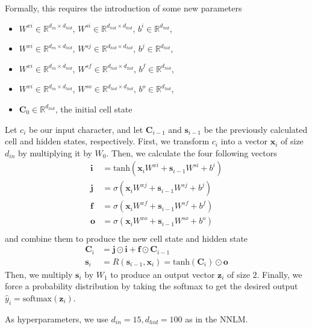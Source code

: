 \documentclass[11pt]{article}
\begin{document}
Formally, this requires the introduction of some new parameters
\begin{itemize}
  \item $W^{xi} \in \mathbb{R}^{d_{in} \times d_{hid}}$, $W^{si} \in \mathbb{R}^{d_{hid} \times d_{hid}}$, $b^i \in \mathbb{R}^{d_{hid}}$, 
  \item $W^{xi} \in \mathbb{R}^{d_{in} \times d_{hid}}$, $W^{sj} \in \mathbb{R}^{d_{hid} \times d_{hid}}$, $b^j \in \mathbb{R}^{d_{hid}}$,
  \item $W^{xi} \in \mathbb{R}^{d_{in} \times d_{hid}}$, $W^{sf} \in \mathbb{R}^{d_{hid} \times d_{hid}}$, $b^f \in \mathbb{R}^{d_{hid}}$,
  \item $W^{xi} \in \mathbb{R}^{d_{in} \times d_{hid}}$, $W^{so} \in \mathbb{R}^{d_{hid} \times d_{hid}}$, $b^o \in \mathbb{R}^{d_{hid}}$,
  \item $\mathbf{C}_0 \in \mathbb{R}^{d_{hid}}$, the initial cell state
\end{itemize}

Let $c_i$ be our input character, and let $\mathbf{C}_{i-1}$ and $\mathbf{s}_{i-1}$ be the previously calculated cell and hidden states, respectively. First, we transform $c_i$ into a vector $\mathbf{x}_i$ of size $d_{in}$ by multiplying it by $W_0$. Then, we calculate the four following vectors
\begin{align*}
  \mathbf{i} &= \text{tanh}(\mathbf{x}_iW^{xi} + \mathbf{s}_{i-1}W^{si} + b^i) \\
  \mathbf{j} &= \sigma(\mathbf{x}_iW^{xj} + \mathbf{s}_{i-1}W^{sj} + b^j) \\
  \mathbf{f} &= \sigma(\mathbf{x}_iW^{xf} + \mathbf{s}_{i-1}W^{sf} + b^f) \\
  \mathbf{o} &= \sigma(\mathbf{x}_iW^{xo} + \mathbf{s}_{i-1}W^{so} + b^o) \\
\end{align*}
and combine them to produce the new cell state and hidden state
\begin{align*}
  \mathbf{C}_i &= \mathbf{j} \odot \mathbf{i} + \mathbf{f} \odot \mathbf{C}_{i-1} \\
  \mathbf{s}_i &= R(\mathbf{s}_{i-1}, \mathbf{x}_i) = \text{tanh}(\mathbf{C}_i) \odot \mathbf{o}
\end{align*}
Then, we multiply $\mathbf{s}_i$ by $W_1$ to produce an output vector $\mathbf{z}_i$ of size $2$. Finally, we force a probability distribution by taking the softmax to get the desired output $\hat{y}_i = \text{softmax}(\mathbf{z}_i)$. 

As hyperparameters, we use $d_{in} = 15, d_{hid} = 100$ as in the NNLM.
\end{document}
